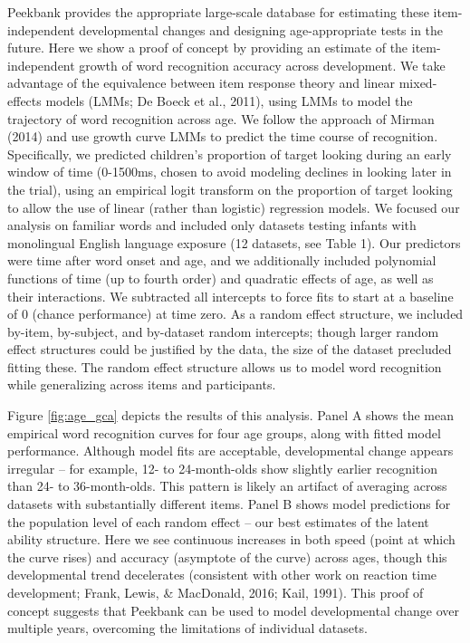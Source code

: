 \documentclass[10pt, letterpaper]{article}
\begin{document}
Peekbank provides the appropriate large-scale database for estimating
these item-independent developmental changes and designing
age-appropriate tests in the future. Here we show a proof of concept by
providing an estimate of the item-independent growth of word recognition
accuracy across development. We take advantage of the equivalence
between item response theory and linear mixed-effects models (LMMs; De
Boeck et al., 2011), using LMMs to model the trajectory of word
recognition across age. We follow the approach of Mirman (2014) and use
growth curve LMMs to predict the time course of recognition.
Specifically, we predicted children's proportion of target looking
during an early window of time (0-1500ms, chosen to avoid modeling
declines in looking later in the trial), using an empirical logit
transform on the proportion of target looking to allow the use of linear
(rather than logistic) regression models. We focused our analysis on
familiar words and included only datasets testing infants with
monolingual English language exposure (12 datasets, see Table 1). Our
predictors were time after word onset and age, and we additionally
included polynomial functions of time (up to fourth order) and quadratic
effects of age, as well as their interactions. We subtracted all
intercepts to force fits to start at a baseline of 0 (chance
performance) at time zero. As a random effect structure, we included
by-item, by-subject, and by-dataset random intercepts; though larger
random effect structures could be justified by the data, the size of the
dataset precluded fitting these. The random effect structure allows us
to model word recognition while generalizing across items and
participants.

Figure \ref{fig:age_gca} depicts the results of this analysis. Panel A
shows the mean empirical word recognition curves for four age groups,
along with fitted model performance. Although model fits are acceptable,
developmental change appears irregular -- for example, 12- to
24-month-olds show slightly earlier recognition than 24- to
36-month-olds. This pattern is likely an artifact of averaging across
datasets with substantially different items. Panel B shows model
predictions for the population level of each random effect -- our best
estimates of the latent ability structure. Here we see continuous
increases in both speed (point at which the curve rises) and accuracy
(asymptote of the curve) across ages, though this developmental trend
decelerates (consistent with other work on reaction time development;
Frank, Lewis, \& MacDonald, 2016; Kail, 1991). This proof of concept
suggests that Peekbank can be used to model developmental change over
multiple years, overcoming the limitations of individual datasets.
\end{document}
